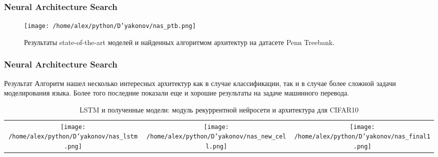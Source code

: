 \documentclass[fleqn, xcolor=x11names]{beamer}
\begin{document}
\begin{frame}\frametitle{Neural Architecture Search}

\begin{figure}[h]
\begin{center}
\texttt{[image: /home/alex/python/D'yakonov/nas\_ptb.png]}
\caption{Результаты state-of-the-art моделей и найденных алгоритмом архитектур на датасете  Penn Treebank.}
\end{center}
\end{figure}

\end{frame}

\begin{frame}\frametitle{Neural Architecture Search}




\begin{block}{Результат}
{\footnotesize Алгоритм нашел несколько интересных архитектур как в случае классификации, так и в случае более сложной задачи моделирования языка. Более того последние показали еще и хорошие результаты на задаче машинного перевода.}
\end{block}

\begin{table}[h]
\begin{center}
\begin{tabular}{*{3}{c}}

\texttt{[image: /home/alex/python/D'yakonov/nas\_lstm.png]} &
\texttt{[image: /home/alex/python/D'yakonov/nas\_new\_cell.png]} &
\texttt{[image: /home/alex/python/D'yakonov/nas\_final1.png]} \\

\end{tabular}
\caption{{\footnotesize LSTM и полученные модели: модуль рекуррентной нейросети и архитектура для CIFAR10}}
\end{center}
\end{table}

\end{frame}
\end{document}
